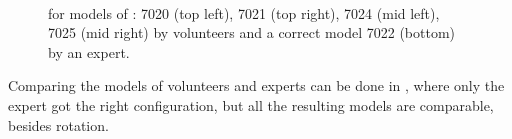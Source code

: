 \begin{figure}
  \centering
   \\
  \caption{\kenc for models of : 7020 (top left), 7021 (top right), 7024 (mid left), 7025 (mid right) by volunteers and a correct model 7022 (bottom) by an expert.}
  \label{fig:kapenc_compare_faulty}
\end{figure}

Comparing the models of volunteers and experts can be done in , where only the
expert got the right configuration, but all the resulting models are comparable, besides rotation.



\clearpage
